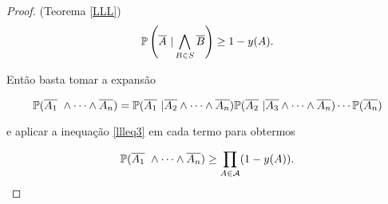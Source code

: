 \begin{proof}{(Teorema \ref{LLL})}
\begin{equation}\label{llleq3}
\mathbb{P}\left(\overline{A}\ |\bigwedge\limits_{B\in S}\overline{B}\right) \geq 1 - y(A).
\end{equation}

Então basta tomar a expansão

\[\mathbb{P}(\overline{A_1}\ \wedge \cdots \wedge \overline{A_n}) = \mathbb{P}(\overline{A_1}\ | \overline{A_2}\wedge \cdots \wedge \overline{A_n})\mathbb{P}(\overline{A_2}\ | \overline{A_3}\wedge \cdots \wedge \overline{A_n})\cdots \mathbb{P}(\overline{A_n})\]

e aplicar a inequação \ref{llleq3} em cada termo para obtermos

\[\mathbb{P}(\overline{A_1}\ \wedge \cdots \wedge \overline{A_n}) \geq \prod_{A\in\mathcal{A}}(1-y(A)).\]
\end{proof}